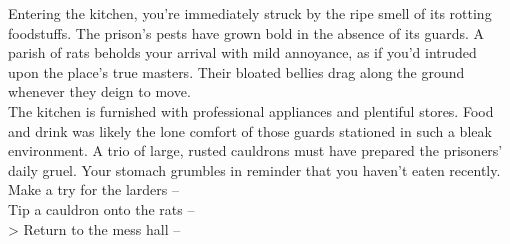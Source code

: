 Entering the kitchen, you're immediately struck by the ripe smell of its rotting foodstuffs. The prison's pests have grown bold in the absence of its guards. A parish of rats beholds your arrival with mild annoyance, as if you'd intruded upon the place's true masters. Their bloated bellies drag along the ground whenever they deign to move.\\

The kitchen is furnished with professional appliances and plentiful stores. Food and drink was likely the lone comfort of those guards stationed in such a bleak environment. A trio of large, rusted cauldrons must have prepared the prisoners' daily gruel. Your stomach grumbles in reminder that you haven’t eaten recently.\\

 Make a try for the larders -- \\
 Tip a cauldron onto the rats -- \\
> Return to the mess hall -- 